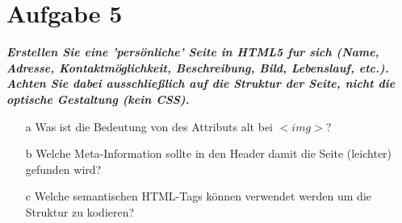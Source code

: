 \documentclass[12pt, a4paper]{report}
\begin{document}
\section*{Aufgabe 5}
\textbf{\textit{Erstellen Sie eine ’persönliche’ Seite in HTML5 fur sich (Name, Adresse, Kontaktmöglichkeit, Beschreibung, Bild, Lebenslauf, etc.). Achten Sie dabei ausschließlich auf die Struktur der Seite, nicht die optische Gestaltung (kein CSS).}}

\begin{itemize}
  \item[a] Was ist die Bedeutung von des Attributs alt bei $<img>$?
  \item[b] Welche Meta-Information sollte in den Header damit die Seite (leichter) gefunden wird?
  \item[c] Welche semantischen HTML-Tags können verwendet werden um die Struktur zu kodieren?
\end{itemize}
\end{document}
